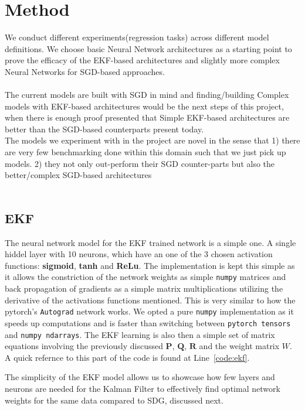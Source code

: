 \documentclass{article}
\begin{document}
\clearpage
\section{Method}

We conduct different experiments(regression tasks) across different model definitions. We choose basic Neural Network architectures as a starting point to prove the efficacy of the EKF-based architectures and slightly more complex Neural Networks for SGD-based approaches.\\
\\
The current models are built with SGD in mind and finding/building Complex models with EKF-based architectures would be the next steps of this project, when there is enough proof presented that Simple EKF-based architectures are better than the SGD-based counterparts present today.\\
The models we experiment with in the project are novel in the sense that 1) there are very few benchmarking done within this domain such that we just pick up models. 2)  they not only out-perform their SGD counter-parts but also the better/complex SGD-based architectures\\
\\
\subsection{EKF}
The neural network model for the EKF trained network is a simple one. A single hiddel layer with 10 neurons, which have an one of the 3 chosen activation functions: \textbf{sigmoid}, \textbf{tanh} and \textbf{ReLu}. The implementation is kept this simple as it allows the constriction of the network weights as simple \texttt{numpy} matrices and back propagation of gradients as a simple matrix multiplications utilizing the derivative of the activations functions mentioned. This is very similar to how the pytorch's \texttt{Autograd} network works. We opted a pure \texttt{numpy} implementation as it speeds up computations and is faster than switching between \texttt{pytorch tensors} and \texttt{numpy ndarrays}. The EKF learning is also then a simple set of matrix equations involving the previously discussed $\boldsymbol{P}$, $\boldsymbol{Q}$, $\boldsymbol{R}$ and the weight matrix $W$. A quick refernce to this part of the code is found at Line~\ref{code:ekf}.

The simplicity of the EKF model allows us to showcase how few layers and neurons are needed for the Kalman Filter to effectively find optimal network weights for the same data compared to SDG, discussed next.
\end{document}
